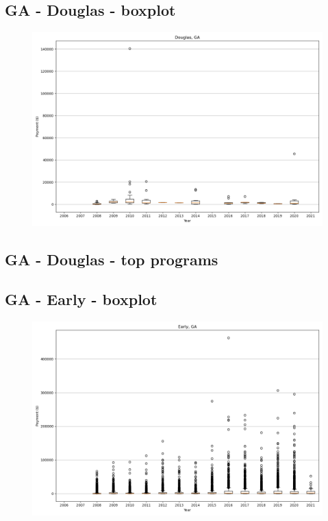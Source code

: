\subsection*{GA - Douglas - boxplot}
\begin{figure}[h]
\centering
\includegraphics[width=7in]{../output/boxplots/counties/Douglas-GA_boxplot.png}
\end{figure}


\subsection*{GA - Douglas - top programs}

\newpage
\subsection*{GA - Early - boxplot}
\begin{figure}[h]
\centering
\includegraphics[width=7in]{../output/boxplots/counties/Early-GA_boxplot.png}
\end{figure}


